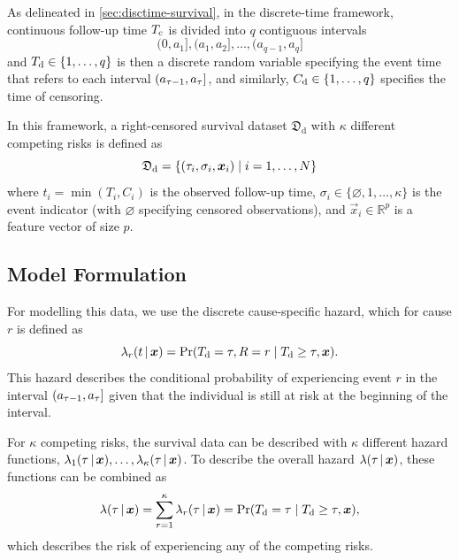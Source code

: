 As delineated in \cref{sec:disctime-survival}, 
in the discrete-time framework, 
continuous follow-up time \({T_{\mathrm{c}}}\) is divided into \(q\) contiguous intervals
%
\begin{equation*}
	(0, a_1], (a_1, a_2], \dots, (a_{q-1}, a_q]
\end{equation*}
%
and \({T_{\mathrm{d}}} \in \{1, \dots, q\}\) is then a discrete random variable 
specifying the event time that refers to each interval 
\((a_{\tau-1}, a_{\tau}]\), and similarly, \({C_{\mathrm{d}}} \in \{1, \dots, q\}\)
specifies the time of censoring.

In this framework, a right-censored survival dataset 
\(\mathfrak{D}_{\mathrm{d}}\) with \(\kappa\) different competing 
risks is defined as
\begin{equation}
    \mathfrak{D}_{\mathrm{d}} = 
        \{(\tau_i, \sigma_i, \bm{x}_i) \mid i = 1, \ldots, N\} 
\end{equation}
where \(t_i = \min(T_{i}, C_i)\) is the observed follow-up time,
\(\sigma_i \in \{\varnothing, 1, \dots, \kappa\}\) is the event indicator 
(with \(\varnothing\) specifying censored observations),
and \(\vec{x}_i \in \mathbb{R}^{p}\) is a feature vector of size \(p\).

\subsection{Model Formulation}

For modelling this data, we use the discrete 
cause-specific hazard, which for cause \(r\) is defined as
~\autocite{tutzModeling2016}
\begin{equation}
    \label{eq:cause-specific-hazard}
    \lambda_r(t \giv \vec{x}) = 
    \Pr(\Tid = \tid, R = r \mid \Tid \geq \tid, \vec{x}).
\end{equation}
This hazard describes the conditional probability of experiencing event \(r\) 
in the interval \((a_{\tau-1}, a_{\tau}]\) given that the individual
is still at risk at the beginning of the interval.

For \(\kappa\) competing risks, the survival data can be described with
\(\kappa\) different hazard functions, 
\(\lambda_{1}(\tau \,|\, \bm{x}), \dots, \lambda_{\kappa}(\tau \,|\, \bm{x})\).
To describe the overall hazard \(\lambda(\tau \,|\, \bm{x})\), 
these functions can be combined as
~\autocite{tutzModeling2016}
\begin{equation}
    \label{eq:overall-hazard}
    \lambda(\tid \giv \vec{x}) 
    = \sum_{r=1}^{\kappa} \lambda_{r}(\tid \giv \vec{x})
    = \Pr(\Tid = \tid \mid \Tid \geq \tid, \vec{x}),
\end{equation}
which describes the risk of experiencing any of the competing risks.

